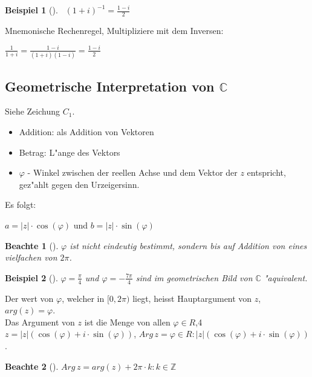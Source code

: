 \documentclass[11pt]{article}
\newtheorem{exa}{Beispiel}[section]
\newtheorem*{notte}{Beachte}
\begin{document}
\begin{exa}[] \label{} \
\((1+i)^{-1}=\frac{1-i}{2}\)
\end{exa}

Mnemonische Rechenregel, Multipliziere mit dem Inversen: 
\begin{relation}
\(\frac{1}{1+i}=\frac{1-i}{(1+i)(1-i)}=\frac{1-i}{2}\)
\end{relation}

\subsection{Geometrische Interpretation von \(\mathbb{C}\)}
\label{sec:org992fe0c}
Siehe Zeichung \(C_1\).

\begin{relation}
\begin{itemize}
\item Addition: als Addition von Vektoren
\item Betrag: L"ange des Vektors
\item \(\varphi\) - Winkel zwischen der reellen Achse und dem Vektor der \(z\) entspricht,
gez"ahlt gegen den Urzeigersinn.
\end{itemize}
\end{relation}

Es folgt:
\begin{relation}
\(a=|z|\cdot \cos(\varphi)\) und \(b=|z|\cdot \sin(\varphi)\)
\end{relation}

\begin{notte}[] \label{}
\(\varphi\) ist nicht eindeutig bestimmt, sondern bis auf Addition von eines
vielfachen von \(2\pi\).
\end{notte}

\begin{exa}[] \label{}
\(\varphi=\frac{\pi}{4}\) und \(\varphi=-\frac{7\pi}{4}\) sind im geometrischen Bild von
\(\mathbb{C}\) "aquivalent.
\end{exa}

\begin{definition}{}{}
Der wert von \(\varphi\), welcher in \([0, 2\pi)\) liegt, heisst Hauptargument von \(z\),
\(arg(z)=\varphi\).\\
Das Argument von \(z\) ist die Menge von allen \(\varphi \in R\),4
\(z=|z|(\cos(\varphi)+i\cdot \sin(\varphi))\), \(Arg\, z = {\varphi \in R : |z|(\cos(\varphi)+i\cdot \sin(\varphi))}\).
\end{definition}

\begin{notte}[] \label{}
\(Arg\, z= {arg(z)+2\pi\cdot k : k\in \mathbb{Z}}\)
\end{notte}
\end{document}
